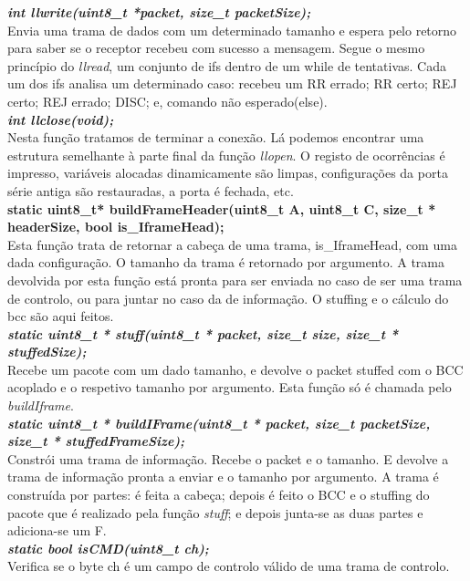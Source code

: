 \documentclass[a4paper]{article}
\begin{document}
\noindent\textbf{\textit{int llwrite(uint8\_t *packet, size\_t packetSize);}}\\
Envia uma trama de dados com um determinado tamanho e espera pelo retorno para
saber se o receptor recebeu com sucesso a mensagem. Segue o mesmo princípio do
\textit{llread}, um conjunto de ifs dentro de um while de tentativas. Cada um
dos ifs analisa um determinado caso: recebeu um RR errado; RR certo; REJ certo;
REJ errado; DISC; e, comando não esperado(else).\\

\noindent\textbf{\textit{int llclose(void);}}\\ Nesta função tratamos de
terminar a conexão. Lá podemos encontrar uma estrutura semelhante à parte final
da função \textit{llopen}. O registo de ocorrências é impresso, variáveis
alocadas dinamicamente são limpas, configurações da porta série antiga são
restauradas, a porta é fechada, etc.\\

\noindent\textbf{static uint8\_t* buildFrameHeader(uint8\_t A, uint8\_t C,
size\_t * headerSize, bool is\_IframeHead);}\\ Esta função trata de retornar a
cabeça de uma trama, is\_IframeHead, com uma dada configuração. O tamanho da
trama é retornado por argumento. A trama devolvida por esta função está pronta
para ser enviada no caso de ser uma trama de controlo, ou para juntar no caso
da de informação. O stuffing e o cálculo do bcc são aqui feitos.\\

\noindent\textbf{\textit{static uint8\_t * stuff(uint8\_t * packet, size\_t
size, size\_t * stuffedSize);}}\\ Recebe um pacote com um dado tamanho, e
devolve o packet stuffed com o BCC acoplado e o respetivo tamanho por
argumento. Esta função só é chamada pelo \textit{buildIframe}. \\

\noindent\textbf{\textit{static uint8\_t * buildIFrame(uint8\_t * packet,
size\_t packetSize, size\_t * stuffedFrameSize);}}\\ Constrói uma trama de
informação. Recebe o packet e o tamanho. E devolve a trama de informação pronta
a enviar e o tamanho por argumento. A trama é construída por partes: é feita a
cabeça; depois é feito o BCC e o stuffing do pacote que é realizado pela função
\textit{stuff}; e depois junta-se as duas partes e adiciona-se um F.\\

\noindent\textbf{\textit{static bool isCMD(uint8\_t ch);}}\\ Verifica se o byte
ch é um campo de controlo válido de uma trama de controlo. \\
\end{document}
